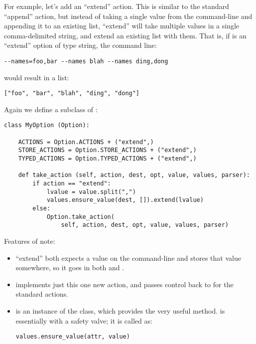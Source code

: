 For example, let's add an ``extend'' action.  This is similar to the
standard ``append'' action, but instead of taking a single value from
the command-line and appending it to an existing list, ``extend'' will
take multiple values in a single comma-delimited string, and extend an
existing list with them.  That is, if  is an
``extend'' option of type string, the command line:

\begin{verbatim}
--names=foo,bar --names blah --names ding,dong
\end{verbatim}

would result in a list:

\begin{verbatim}
["foo", "bar", "blah", "ding", "dong"]
\end{verbatim}

Again we define a subclass of :

\begin{verbatim}
class MyOption (Option):

    ACTIONS = Option.ACTIONS + ("extend",)
    STORE_ACTIONS = Option.STORE_ACTIONS + ("extend",)
    TYPED_ACTIONS = Option.TYPED_ACTIONS + ("extend",)

    def take_action (self, action, dest, opt, value, values, parser):
        if action == "extend":
            lvalue = value.split(",")
            values.ensure_value(dest, []).extend(lvalue)
        else:
            Option.take_action(
                self, action, dest, opt, value, values, parser)
\end{verbatim}

Features of note:

\begin{itemize}
\item ``extend'' both expects a value on the command-line and stores that
value somewhere, so it goes in both  and
.

\item {} implements just this one new
action, and passes control back to  for
the standard  actions.

\item {} is an instance of the  class, which
provides the very useful 
method.  is essentially 
with a safety valve; it is called as:

\begin{verbatim}
values.ensure_value(attr, value)
\end{verbatim}
\end{itemize}

